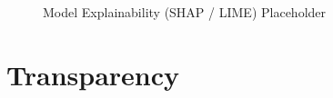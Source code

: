\documentclass[12pt, a4paper]{report}
\begin{document}
\lipsum[42][1-4]

\begin{figure}[H]
    \centering
    \fbox{\rule{0pt}{4cm}\rule{0.75\textwidth}{0pt}}
    \caption{Model Explainability (SHAP / LIME) Placeholder}
    \label{fig:explainability}
\end{figure}

\lipsum[43][1-2]

\section{Transparency}

\lipsum[44][1-4]

\end{document}
